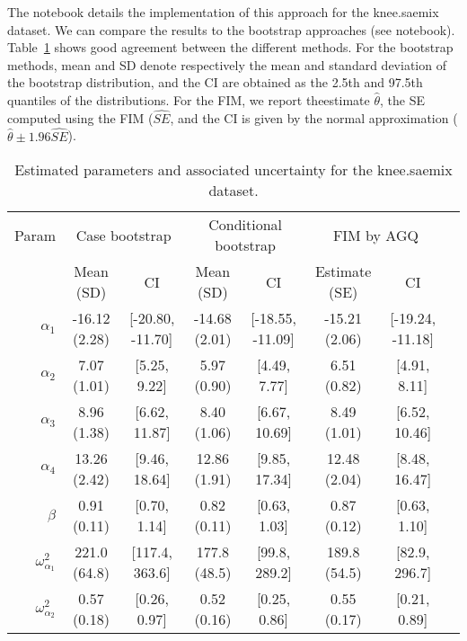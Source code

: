The notebook details the implementation of this approach for the {\sf knee.saemix} dataset. We can compare the results to the bootstrap approaches (see notebook). Table~\ref{tab:kneeSE} shows good agreement between the different methods. For the bootstrap methods, mean and SD denote respectively the mean and standard deviation of the bootstrap distribution, and the CI are obtained as the 2.5th and 97.5th quantiles of the distributions. For the FIM, we report the\saemix estimate $\hat{\theta}$, the SE computed using the FIM ($\hat{SE}$, and the CI is given by the normal approximation ($\hat{\theta} \pm 1.96 \hat{SE}$).

\begin{table}[ht]
\centering
\begin{tabular}{rccccccc}
  \hline
    Param & \multicolumn{2}{c}{Case bootstrap} & \multicolumn{2}{c}{Conditional bootstrap}  & \multicolumn{2}{c}{FIM by AGQ} \\
 & Mean (SD) & CI & Mean (SD) & CI & Estimate (SE) & CI \\ 
  \hline
$\alpha_1$ & -16.12 (2.28) & [-20.80, -11.70] & -14.68 (2.01) & [-18.55, -11.09] & -15.21 (2.06) & [-19.24, -11.18] \\ 
  $\alpha_2$ &  7.07 (1.01) & [5.25, 9.22] &   5.97 (0.90) & [4.49, 7.77] &   6.51 (0.82) & [4.91, 8.11] \\ 
  $\alpha_3$ &   8.96 (1.38) & [6.62, 11.87] &   8.40 (1.06) & [6.67, 10.69] &   8.49 (1.01) & [6.52, 10.46] \\ 
  $\alpha_4$ &  13.26 (2.42) & [9.46, 18.64] &  12.86 (1.91) & [9.85, 17.34] &  12.48 (2.04) & [8.48, 16.47] \\ 
  $\beta$ &  0.91 (0.11) & [0.70, 1.14] &   0.82 (0.11) & [0.63, 1.03] &   0.87 (0.12) & [0.63, 1.10] \\ 
  $\omega^2_{\alpha_1}$ & 221.0 (64.8) & [117.4, 363.6] & 177.8 (48.5) & [99.8, 289.2] & 189.8 (54.5) & [82.9, 296.7] \\ 
  $\omega^2_{\alpha_2}$ & 0.57 (0.18) & [0.26, 0.97] &   0.52 (0.16) & [0.25, 0.86] &   0.55 (0.17) & [0.21, 0.89] \\ 
   \hline
\end{tabular}
\caption{Estimated parameters and associated uncertainty for the {\sf knee.saemix} dataset.} \label{tab:kneeSE}
\end{table}

